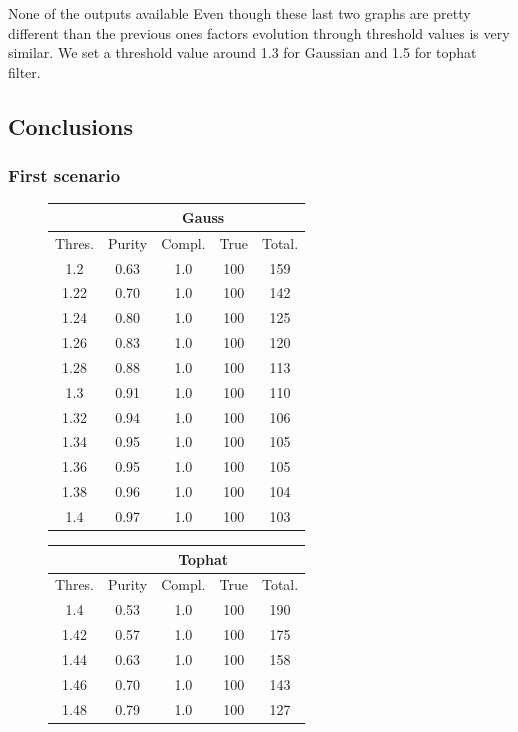 \documentclass{article}
\begin{document}
None of the outputs available 
Even though these last two graphs are pretty different than the previous ones factors evolution through threshold values is very similar. We set a threshold value around 1.3 for Gaussian and 1.5 for tophat filter.

\subsection{Conclusions}

\subsubsection{First scenario}
\begin{figure}[H]
\centering
\begin{tabular}{|c|c|c|c|c|}
\hline
\multicolumn{1}{|c|}{} & \multicolumn{4}{c|}{Gauss} \\
\hline \hline
Thres. & Purity & Compl. & True & Total.\\
\hline
1.2 & 0.63 & 1.0 & 100 & 159\\
\hline
1.22 & 0.70 & 1.0 & 100 & 142\\
\hline
1.24 & 0.80 & 1.0 & 100 & 125\\
\hline
1.26 & 0.83 & 1.0 & 100 & 120\\
\hline
1.28 & 0.88 & 1.0 & 100 & 113\\
\hline
1.3 & 0.91 & 1.0 & 100 & 110\\
\hline
1.32 & 0.94 & 1.0 & 100 & 106\\
\hline
1.34 & 0.95 & 1.0 & 100 & 105\\
\hline
1.36 & 0.95 & 1.0 & 100 & 105\\
\hline
1.38 & 0.96 & 1.0 & 100 & 104\\
\hline
1.4 & 0.97 & 1.0 & 100 & 103\\
\hline
\end{tabular}
\qquad
\begin{tabular}{|c|c|c|c|c|}
\hline
\multicolumn{1}{|c|}{} & \multicolumn{4}{c|}{Tophat} \\
\hline \hline
Thres. & Purity & Compl. & True & Total.\\
\hline
1.4 & 0.53 & 1.0 & 100 & 190\\
\hline
1.42 & 0.57 & 1.0 & 100 & 175\\
\hline
1.44 & 0.63 & 1.0 & 100 & 158\\
\hline
1.46 & 0.70 & 1.0 & 100 & 143\\
\hline
1.48 & 0.79 & 1.0 & 100 & 127\\

\end{tabular}
\end{figure}
\end{document}
